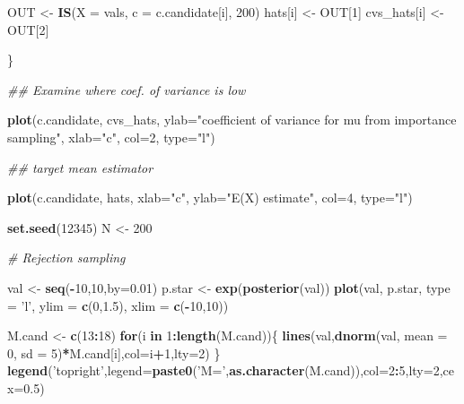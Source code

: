 \documentclass[
]{article}
\newenvironment{Shaded}{\begin{snugshade}}{\end{snugshade}}
\newcommand{\CommentTok}[1]{\textcolor[rgb]{0.56,0.35,0.01}{\textit{#1}}}
\newcommand{\ControlFlowTok}[1]{\textcolor[rgb]{0.13,0.29,0.53}{\textbf{#1}}}
\newcommand{\DataTypeTok}[1]{\textcolor[rgb]{0.13,0.29,0.53}{#1}}
\newcommand{\DecValTok}[1]{\textcolor[rgb]{0.00,0.00,0.81}{#1}}
\newcommand{\FloatTok}[1]{\textcolor[rgb]{0.00,0.00,0.81}{#1}}
\newcommand{\KeywordTok}[1]{\textcolor[rgb]{0.13,0.29,0.53}{\textbf{#1}}}
\newcommand{\NormalTok}[1]{#1}
\newcommand{\OperatorTok}[1]{\textcolor[rgb]{0.81,0.36,0.00}{\textbf{#1}}}
\newcommand{\StringTok}[1]{\textcolor[rgb]{0.31,0.60,0.02}{#1}}
\begin{document}
\begin{Shaded}
\begin{Highlighting}[]
{{{{\NormalTok{    OUT <-}\StringTok{ }\KeywordTok{IS}\NormalTok{(}\DataTypeTok{X =}\NormalTok{ vals, }\DataTypeTok{c =}\NormalTok{ c.candidate[i], }\DecValTok{200}\NormalTok{)}
\NormalTok{    hats[i] <-}\StringTok{ }\NormalTok{OUT[}\DecValTok{1}\NormalTok{]}
\NormalTok{    cvs_hats[i] <-}\StringTok{ }\NormalTok{OUT[}\DecValTok{2}\NormalTok{]}
    
\NormalTok{\} }


\CommentTok{## Examine where coef. of variance is low}

\KeywordTok{plot}\NormalTok{(c.candidate, cvs_hats, }\DataTypeTok{ylab=}\StringTok{"coefficient of variance for mu from importance sampling"}\NormalTok{, }\DataTypeTok{xlab=}\StringTok{"c"}\NormalTok{, }\DataTypeTok{col=}\DecValTok{2}\NormalTok{, }\DataTypeTok{type=}\StringTok{"l"}\NormalTok{)}


\CommentTok{## target mean estimator}

\KeywordTok{plot}\NormalTok{(c.candidate, hats, }\DataTypeTok{xlab=}\StringTok{"c"}\NormalTok{, }\DataTypeTok{ylab=}\StringTok{"E(X) estimate"}\NormalTok{, }\DataTypeTok{col=}\DecValTok{4}\NormalTok{, }\DataTypeTok{type=}\StringTok{"l"}\NormalTok{)}



\KeywordTok{set.seed}\NormalTok{(}\DecValTok{12345}\NormalTok{)}
\NormalTok{N <-}\StringTok{ }\DecValTok{200}

\CommentTok{# Rejection sampling}

\NormalTok{val <-}\StringTok{ }\KeywordTok{seq}\NormalTok{(}\OperatorTok{-}\DecValTok{10}\NormalTok{,}\DecValTok{10}\NormalTok{,}\DataTypeTok{by=}\FloatTok{0.01}\NormalTok{)}
\NormalTok{p.star <-}\StringTok{ }\KeywordTok{exp}\NormalTok{(}\KeywordTok{posterior}\NormalTok{(val))}
\KeywordTok{plot}\NormalTok{(val, p.star, }\DataTypeTok{type =} \StringTok{'l'}\NormalTok{, }\DataTypeTok{ylim =} \KeywordTok{c}\NormalTok{(}\DecValTok{0}\NormalTok{,}\FloatTok{1.5}\NormalTok{), }\DataTypeTok{xlim =} \KeywordTok{c}\NormalTok{(}\OperatorTok{-}\DecValTok{10}\NormalTok{,}\DecValTok{10}\NormalTok{))}

\NormalTok{M.cand <-}\StringTok{ }\KeywordTok{c}\NormalTok{(}\DecValTok{13}\OperatorTok{:}\DecValTok{18}\NormalTok{)}
\ControlFlowTok{for}\NormalTok{(i }\ControlFlowTok{in} \DecValTok{1}\OperatorTok{:}\KeywordTok{length}\NormalTok{(M.cand))\{ }
  \KeywordTok{lines}\NormalTok{(val,}\KeywordTok{dnorm}\NormalTok{(val, }\DataTypeTok{mean =} \DecValTok{0}\NormalTok{, }\DataTypeTok{sd =} \DecValTok{5}\NormalTok{)}\OperatorTok{*}\NormalTok{M.cand[i],}\DataTypeTok{col=}\NormalTok{i}\OperatorTok{+}\DecValTok{1}\NormalTok{,}\DataTypeTok{lty=}\DecValTok{2}\NormalTok{)}
\NormalTok{\}}
\KeywordTok{legend}\NormalTok{(}\StringTok{'topright'}\NormalTok{,}\DataTypeTok{legend=}\KeywordTok{paste0}\NormalTok{(}\StringTok{'M='}\NormalTok{,}\KeywordTok{as.character}\NormalTok{(M.cand)),}\DataTypeTok{col=}\DecValTok{2}\OperatorTok{:}\DecValTok{5}\NormalTok{,}\DataTypeTok{lty=}\DecValTok{2}\NormalTok{,}\DataTypeTok{cex=}\FloatTok{0.5}\NormalTok{)}

}}}}
\end{Highlighting}
\end{Shaded}
\end{document}
